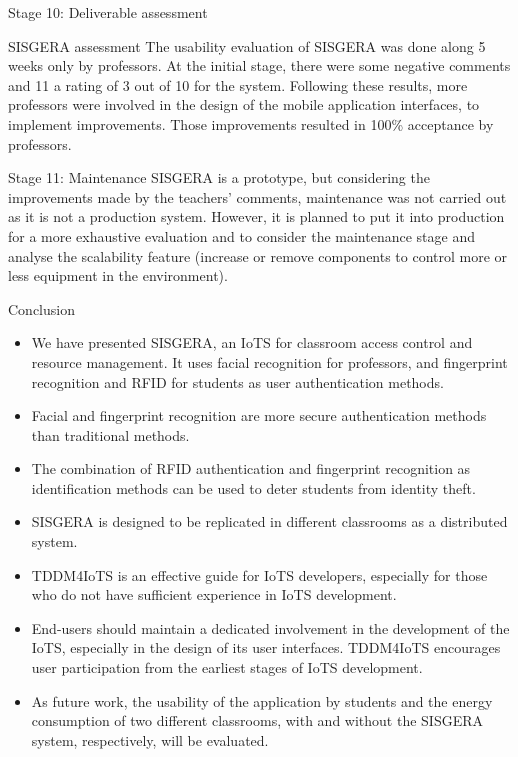\documentclass[notes=show, 10pt]{beamer}
\begin{document}
    \begin{frame}{Stage 10: Deliverable assessment}
        \begin{block}{SISGERA assessment}
            The usability evaluation of SISGERA was done along 5 weeks only by professors. At the initial stage, there were some negative comments and 11 a rating of 3 out of 10 for the system. Following these results, more professors were involved in the design of the mobile application interfaces, to implement improvements. Those improvements resulted in 100\% acceptance by professors.
        \end{block}
        \begin{block}{Stage 11: Maintenance}
            SISGERA is a prototype, but considering the improvements made by the teachers' comments, maintenance was not carried out as it is not a production system. However, it is planned to put it into production for a more exhaustive evaluation and to consider the maintenance stage and analyse the scalability feature (increase or remove components to control more or less equipment in the environment).
        \end{block}
    \end{frame}
    
    \begin{frame}{Conclusion}
            \begin{itemize}
                \item We have presented SISGERA, an IoTS for classroom access control and resource management. It uses facial recognition for professors, and fingerprint recognition and RFID for students as user authentication methods.
                \item Facial and fingerprint recognition are more secure authentication methods than traditional methods.
                \item The combination of RFID authentication and fingerprint recognition as identification methods can be used to deter students from identity theft.
                \item SISGERA is designed to be replicated in different classrooms as a distributed system.
                \item TDDM4IoTS is an effective guide for IoTS developers, especially for those who do not have sufficient experience in IoTS development.
                \item End-users should maintain a dedicated involvement in the development of the IoTS, especially in the design of its user interfaces.
                TDDM4IoTS encourages user participation from the earliest stages of IoTS development.
                \item As future work, the usability of the application by students and the energy consumption of two different classrooms, with and without the SISGERA system, respectively, will be evaluated.
            \end{itemize}
    \end{frame}
\end{document}
